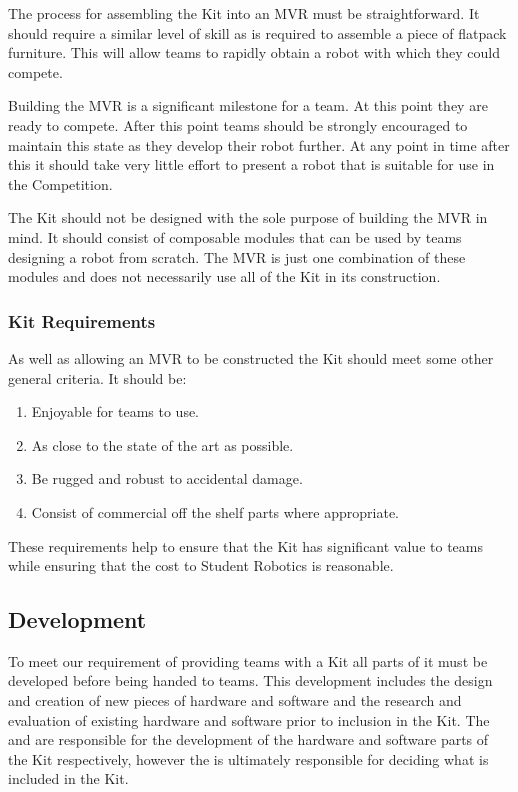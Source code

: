 \begin{draft}
The process for assembling the Kit into an MVR must be straightforward. It should require a similar level of skill as is required to assemble a piece of flatpack furniture. This will allow teams to rapidly obtain a robot with which they could compete.

Building the MVR is a significant milestone for a team. At this point they are ready to compete. After this point teams should be strongly encouraged to maintain this state as they develop their robot further. At any point in time after this it should take very little effort to present a robot that is suitable for use in the Competition.

The Kit should not be designed with the sole purpose of building the MVR in mind. It should consist of composable modules that can be used by teams designing a robot from scratch. The MVR is just one combination of these modules and does not necessarily use all of the Kit in its construction.

\subsubsection{Kit Requirements}

As well as allowing an MVR to be constructed the Kit should meet some other general criteria. It should be:

\begin{enumerate}
  \item Enjoyable for teams to use.
  \item As close to the state of the art as possible.
  \item Be rugged and robust to accidental damage.
  \item Consist of commercial off the shelf parts where appropriate.
\end{enumerate}

These requirements help to ensure that the Kit has significant value to teams while ensuring that the cost to Student Robotics is reasonable.

\subsection{Development}

To meet our requirement of providing teams with a Kit all parts of it must be developed before being handed to teams. This development includes the design and creation of new pieces of hardware and software and the research and evaluation of existing hardware and software prior to inclusion in the Kit. The  and  are responsible for the development of the hardware and software parts of the Kit respectively, however the  is ultimately responsible for deciding what is included in the Kit.


\end{draft}
